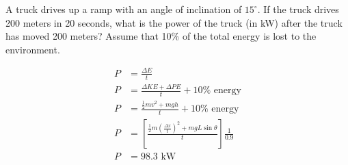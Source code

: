 \begin{problem}
    A truck drives up a ramp with an angle of inclination of $15^\circ$. If the truck drives 200 meters in 20 seconds, what is the power of the truck (in kW) after the truck has moved 200 meters? Assume that 10\% of the total energy is lost to the environment.

    $$
    \begin{aligned}
        P &= \frac{\Delta E}{t}\\
        P &= \frac{\Delta KE + \Delta PE}{t}+ 10\%\text{ energy}\\
        P &= \frac{\frac{1}{2}mv^2 + mgh}{t} + 10\%\text{ energy}\\
        P &= \left[\frac{\frac{1}{2}m\left(\frac{\Delta x}{t}\right)^2 + mgL\sin\theta}{t}\right]\frac{1}{0.9}\\
        P &= 98.3 \text{ kW}
    \end{aligned}
    $$
\end{problem}


